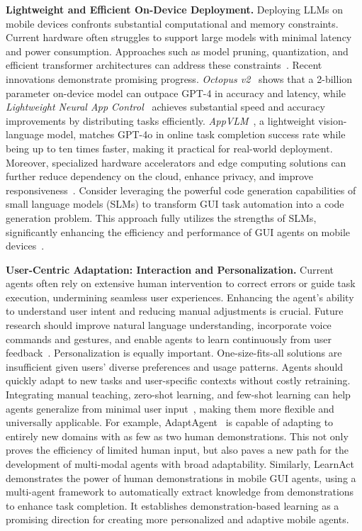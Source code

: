 \noindent\textbf{Lightweight and Efficient On-Device Deployment.}
Deploying LLMs on mobile devices confronts substantial computational and memory constraints. Current hardware often struggles to support large models with minimal latency and power consumption. Approaches such as model pruning, quantization, and efficient transformer architectures can address these constraints~\cite{ding2024mobileagentsop}. 
Recent innovations demonstrate promising progress. \textit{Octopus v2}~\cite{chen2024octopus} shows that a 2-billion parameter on-device model can outpace GPT-4 in accuracy and latency, while \textit{Lightweight Neural App Control}~\cite{christianos2024lightweight} achieves substantial speed and accuracy improvements by distributing tasks efficiently. \textit{AppVLM}~\cite{papoudakis2025appvlm}, a lightweight vision-language model, matches GPT-4o in online task completion success rate while being up to ten times faster, making it practical for real-world deployment. Moreover, specialized hardware accelerators and edge computing solutions can further reduce dependency on the cloud, enhance privacy, and improve responsiveness~\cite{wang2024mobileagentv2}. 
Consider leveraging the powerful code generation capabilities of small language models (SLMs) to transform GUI task automation into a code generation problem. This approach fully utilizes the strengths of SLMs, significantly enhancing the efficiency and performance of GUI agents on mobile devices~\cite{wen2024autodroidv2, wang2024comprehensive}.



\noindent\textbf{User-Centric Adaptation: Interaction and Personalization.}
Current agents often rely on extensive human intervention to correct errors or guide task execution, undermining seamless user experiences. Enhancing the agent's ability to understand user intent and reducing manual adjustments is crucial. Future research should improve natural language understanding, incorporate voice commands and gestures, and enable agents to learn continuously from user feedback~\cite{lee2023exploremobilegpt,wang2024mobileagentv1, wang2024mobileagentv2, citation-111}.
Personalization is equally important. One-size-fits-all solutions are insufficient given users' diverse preferences and usage patterns. Agents should quickly adapt to new tasks and user-specific contexts without costly retraining. Integrating manual teaching, zero-shot learning, and few-shot learning can help agents generalize from minimal user input~\cite{sodhi2024step, lee2023exploremobilegpt,song2024visiontasker,li2024uinav}, making them more flexible and universally applicable.
For example, AdaptAgent~\cite{verma2024adaptagent} is capable of adapting to entirely new domains with as few as two human demonstrations. This not only proves the efficiency of limited human input, but also paves a new path for the development of multi-modal agents with broad adaptability. Similarly, LearnAct~\cite{liu2025learnact} demonstrates the power of human demonstrations in mobile GUI agents, using a multi-agent framework to automatically extract knowledge from demonstrations to enhance task completion. It establishes demonstration-based learning as a promising direction for creating more personalized and adaptive mobile agents.



